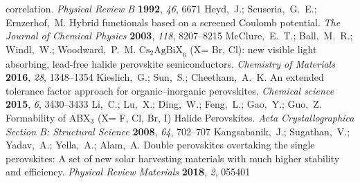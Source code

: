 \documentclass[journal=jpclcd,manuscript=letter]{achemso}
\begin{document}
\begin{mcitethebibliography}{49}
  correlation. \emph{Physical Review B} \textbf{1992}, \emph{46}, 6671\relax
\mciteBstWouldAddEndPuncttrue
\mciteSetBstMidEndSepPunct{\mcitedefaultmidpunct}
{\mcitedefaultendpunct}{\mcitedefaultseppunct}\relax
\EndOfBibitem
{}
Heyd,~J.; Scuseria,~G.~E.; Ernzerhof,~M. Hybrid functionals based on a screened
  Coulomb potential. \emph{The Journal of Chemical Physics} \textbf{2003},
  \emph{118}, 8207--8215\relax
\mciteBstWouldAddEndPuncttrue
\mciteSetBstMidEndSepPunct{\mcitedefaultmidpunct}
{\mcitedefaultendpunct}{\mcitedefaultseppunct}\relax
\EndOfBibitem
{}
McClure,~E.~T.; Ball,~M.~R.; Windl,~W.; Woodward,~P.~M.
  ${\mathrm{Cs}}_{2}{\mathrm{AgBiX}}_{6}$ (X= Br, Cl): new visible light
  absorbing, lead-free halide perovskite semiconductors. \emph{Chemistry of
  Materials} \textbf{2016}, \emph{28}, 1348--1354\relax
\mciteBstWouldAddEndPuncttrue
\mciteSetBstMidEndSepPunct{\mcitedefaultmidpunct}
{\mcitedefaultendpunct}{\mcitedefaultseppunct}\relax
\EndOfBibitem
{}
Kieslich,~G.; Sun,~S.; Cheetham,~A.~K. An extended tolerance factor approach
  for organic--inorganic perovskites. \emph{Chemical science} \textbf{2015},
  \emph{6}, 3430--3433\relax
\mciteBstWouldAddEndPuncttrue
\mciteSetBstMidEndSepPunct{\mcitedefaultmidpunct}
{\mcitedefaultendpunct}{\mcitedefaultseppunct}\relax
\EndOfBibitem
{}
Li,~C.; Lu,~X.; Ding,~W.; Feng,~L.; Gao,~Y.; Guo,~Z. Formability of
  ${\mathrm{ABX}}_{3}$ (X= F, Cl, Br, I) Halide Perovskites. \emph{Acta
  Crystallographica Section B: Structural Science} \textbf{2008}, \emph{64},
  702--707\relax
\mciteBstWouldAddEndPuncttrue
\mciteSetBstMidEndSepPunct{\mcitedefaultmidpunct}
{\mcitedefaultendpunct}{\mcitedefaultseppunct}\relax
\EndOfBibitem
{}
Kangsabanik,~J.; Sugathan,~V.; Yadav,~A.; Yella,~A.; Alam,~A. Double
  perovskites overtaking the single perovskites: A set of new solar harvesting
  materials with much higher stability and efficiency. \emph{Physical Review
  Materials} \textbf{2018}, \emph{2}, 055401\relax
\mciteBstWouldAddEndPuncttrue
\mciteSetBstMidEndSepPunct{\mcitedefaultmidpunct}
{\mcitedefaultendpunct}{\mcitedefaultseppunct}\relax
\EndOfBibitem
{}

\end{mcitethebibliography}
\end{document}
